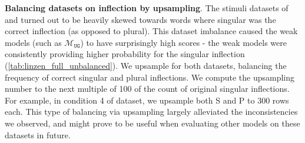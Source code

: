 \documentclass[letterpaper, 12pt]{report}
\newcommand{\xhdr}[1]{{\noindent\bfseries #1}.}
\newcommand{\RC}{$\mathcal{M}_{\texttt{UG}}$}
\begin{document}
\begin{figure}[]
    \centering
    \caption{\citet{linzen-etal-2016-assessing}}
    \label{fig:mlm_linzen_diff}
\end{figure}


\begin{figure}[h]
    \centering
    \caption{\citet{gulordava-etal-2018-colorless}}
    \label{fig:mlm_gul_diff}
\end{figure}

\xhdr{Balancing datasets on inflection by upsampling}
The stimuli datasets of \citet{linzen-etal-2016-assessing} and \citet{gulordava-etal-2018-colorless} turned out to be heavily skewed towards words where singular was the correct inflection (as opposed to plural). This dataset imbalance caused the weak models (such as \RC) to have surprisingly high scores - the weak models were consistently providing higher probability for the singular inflection (\autoref{tab:linzen_full_unbalanced}). We upsample for both datasets, balancing the frequency of correct singular and plural inflections. We compute the upsampling number to the next multiple of 100 of the count of original singular inflections. For example, in condition 4 of \citet{linzen-etal-2016-assessing} dataset, we upsample both S and P to 300 rows each. This type of balancing via upsampling largely alleviated the inconsistencies we observed, and might prove to be useful when evaluating other models on these datasets in future.
\end{document}
